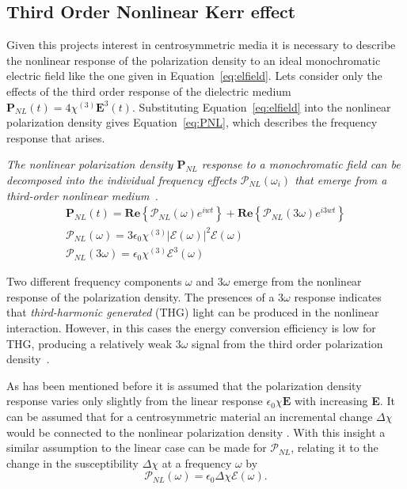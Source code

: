\subsection{Third Order Nonlinear Kerr effect}
Given this projects interest in centrosymmetric media it is necessary to describe the nonlinear response of the polarization density to an ideal monochromatic electric field like the one given in Equation~\ref{eq:elfield}.  Lets consider only the effects of the third order response of the dielectric medium $\textbf{P}_{NL}(t)=4\chi^{(3)}\textbf{E}^3(t)$. Substituting Equation~\ref{eq:elfield}  into the nonlinear polarization density  gives Equation~\ref{eq:PNL}, which describes the frequency response that arises.

\begin{tcolorbox}[title=Nonlinear Polarization Density]
\emph{The nonlinear polarization density $\textbf{P}_{NL}$ response to a monochromatic field can be decomposed into the individual frequency effects $\mathcal{P}_{NL}(\omega_i)$ that emerge from a third-order nonlinear medium~\cite{FundPhoto}.}
\begin{subequations}
\begin{gather}
\textbf{P}_{NL}(t)= \textbf{Re}\left\{\mathcal{P}_{NL}(\omega)e^{iwt}\right\}+\textbf{Re}\left\{\mathcal{P}_{NL}(3\omega)e^{i3wt}\right\}\\
\mathcal{P}_{NL}(\omega)=3\epsilon_0\chi^{(3)}|\mathcal{E}(\omega)|^2\mathcal{E}(\omega)\label{eq:wres}\\
\mathcal{P}_{NL}(3\omega)=\epsilon_0\chi^{(3)}\mathcal{E}^3(\omega)
\end{gather}
\label{eq:PNL}
\end{subequations}
\end{tcolorbox}

Two different frequency components $\omega$ and $3\omega$ emerge from the nonlinear response of the polarization density. The presences of a $3\omega$ response indicates that \emph{third-harmonic generated} (THG) light can be produced in the nonlinear interaction. However, in this cases the energy conversion efficiency is low for THG, 
producing a relatively weak $3\omega$ signal from the third order polarization density~\cite{FundPhoto}.
 
As has been mentioned before it is assumed that the polarization density response varies only slightly from the linear response $\epsilon_0\chi\textbf{E}$ with increasing \textbf{E}. It can be assumed that for a centrosymmetric material  an incremental change $\Delta\chi$ would be connected to the nonlinear polarization density \cite{FundPhoto,FiberAgrawal}. With this insight a similar assumption to the linear case can be made for $\mathcal{P}_{NL}$, relating it to the change in the susceptibility $\Delta\chi$ at a frequency $\omega$ by 
\begin{equation}
\mathcal{P}_{NL}(\omega)=\epsilon_0\Delta\chi\mathcal{E}(\omega).\label{eq:incPE}
\end{equation}


